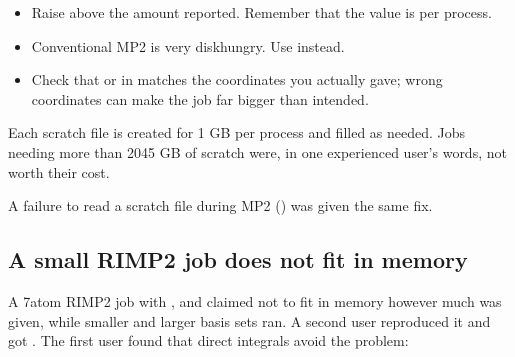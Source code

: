 \documentclass[letterpaper,10pt,english,openany,oneside]{sphinxmanual}
\begin{document}
\sphinxAtStartPar
{}
\begin{itemize}
\item {} 
\sphinxAtStartPar
Raise {\hyperref[\detokenize{reference/system:system-disk}]{}} above the amount reported. Remember that the value is per process.



\item {} 
\sphinxAtStartPar
Conventional MP2 is very disk\sphinxhyphen{}hungry. Use  instead.



\item {} 
\sphinxAtStartPar
Check that  or  in  matches the coordinates you actually gave; wrong coordinates
can make the job far bigger than intended. 

\end{itemize}

\sphinxAtStartPar
Each scratch file is created for 1 GB per process and filled as needed. Jobs needing more than 20\textendash{}45 GB of scratch
were, in one experienced user’s words, not worth their cost.



\sphinxAtStartPar
A failure to read a scratch file during MP2 () was given the same fix.




\subsection{A small RI\sphinxhyphen{}MP2 job does not fit in memory}
\label{\detokenize{troubleshooting/common-problems:a-small-ri-mp2-job-does-not-fit-in-memory}}
\sphinxAtStartPar
A 7\sphinxhyphen{}atom RI\sphinxhyphen{}MP2 job with ,  and  claimed not to fit in memory however much was given,
while smaller and larger basis sets ran. A second user reproduced it and got .
The first user found that direct integrals avoid the problem:

\begin{sphinxVerbatim}[commandchars=\\\{\}]
\end{sphinxVerbatim}
\end{document}
